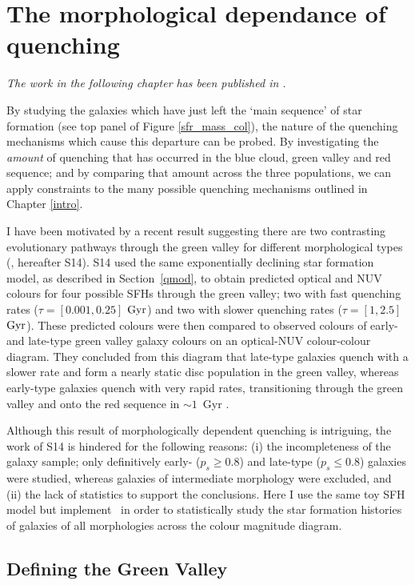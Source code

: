 \chapter{The morphological dependance of quenching}\label{morph}

\emph{The work in the following chapter has been published in \citet{smethurst15}.}


By studying the galaxies which have just left the `main sequence' of star formation (see top panel of Figure \ref{sfr_mass_col}), the nature of the quenching mechanisms which cause this departure can be probed. By investigating the \emph{amount} of quenching that has occurred in the blue cloud, green valley and red sequence; and by comparing that amount across the three populations, we can apply constraints to the many possible quenching mechanisms outlined in Chapter \ref{intro}. 

I have been motivated by a recent result suggesting there are two contrasting evolutionary pathways through the green valley for different morphological types (\citealt{schawinski14}, hereafter S14). S14 used the same exponentially declining star formation model, as described in Section~\ref{qmod}, to obtain predicted optical and NUV colours for four possible SFHs through the green valley; two with fast quenching rates ($\tau = [0.001, 0.25]$ $\rm{Gyr}$) and two with slower quenching rates ($\tau = [1, 2.5]$ $\rm{Gyr}$). These predicted colours were then compared to observed colours of early- and late-type green valley galaxy colours on an optical-NUV colour-colour diagram. They concluded from this diagram that late-type galaxies quench with a slower rate and form a nearly static disc population in the green valley, whereas early-type galaxies quench with very rapid rates, transitioning through the green valley and onto the red sequence in $\sim 1$~Gyr \citep{Wong12}. 

Although this result of morphologically dependent quenching is intriguing, the work of S14 is hindered for the following reasons: (i) the incompleteness of the galaxy sample; only definitively early- ($p_s \geq 0.8$) and late-type ($p_s \leq 0.8$) galaxies were studied, whereas galaxies of intermediate morphology were excluded, and (ii) the lack of statistics to support the conclusions. Here I use the same toy SFH model but implement \starpy ~in order to statistically study the star formation histories of galaxies of all morphologies across the colour magnitude diagram.


\section{Defining the Green Valley}\label{defGV}

